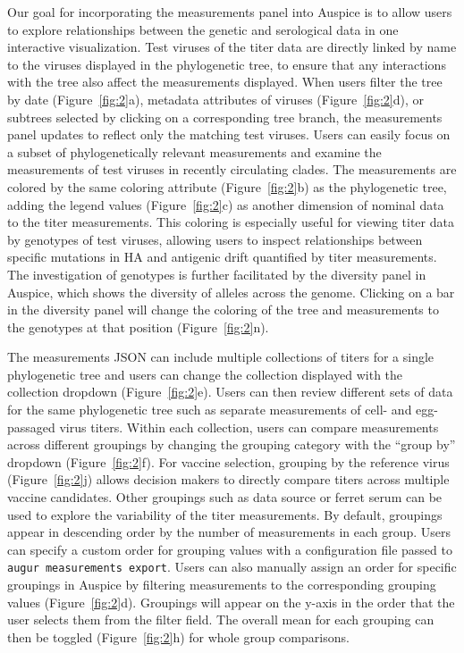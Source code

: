 \documentclass[utf8]{FrontiersinHarvard} %
\begin{document}
Our goal for incorporating the measurements panel into Auspice is to allow users to explore relationships between the genetic and serological data in one interactive visualization.
Test viruses of the titer data are directly linked by name to the viruses displayed in the phylogenetic tree, to ensure that any interactions with the tree also affect the measurements displayed.
When users filter the tree by date (Figure~\ref{fig:2}a), metadata attributes of viruses (Figure~\ref{fig:2}d), or subtrees selected by clicking on a corresponding tree branch, the measurements panel updates to reflect only the matching test viruses.
Users can easily focus on a subset of phylogenetically relevant measurements and examine the measurements of test viruses in recently circulating clades.
The measurements are colored by the same coloring attribute (Figure~\ref{fig:2}b) as the phylogenetic tree, adding the legend values (Figure~\ref{fig:2}c) as another dimension of nominal data to the titer measurements.
This coloring is especially useful for viewing titer data by genotypes of test viruses, allowing users to inspect relationships between specific mutations in HA and antigenic drift quantified by titer measurements.
The investigation of genotypes is further facilitated by the diversity panel in Auspice, which shows the diversity of alleles across the genome.
Clicking on a bar in the diversity panel will change the coloring of the tree and measurements to the genotypes at that position (Figure~\ref{fig:2}n).

The measurements JSON can include multiple collections of titers for a single phylogenetic tree and users can change the collection displayed with the collection dropdown (Figure~\ref{fig:2}e).
Users can then review different sets of data for the same phylogenetic tree such as separate measurements of cell- and egg-passaged virus titers.
Within each collection, users can compare measurements across different groupings by changing the grouping category with the ``group by'' dropdown (Figure~\ref{fig:2}f).
For vaccine selection, grouping by the reference virus (Figure~\ref{fig:2}j) allows decision makers to directly compare titers across multiple vaccine candidates.
Other groupings such as data source or ferret serum can be used to explore the variability of the titer measurements.
By default, groupings appear in descending order by the number of measurements in each group.
Users can specify a custom order for grouping values with a configuration file passed to \texttt{augur measurements export}.
Users can also manually assign an order for specific groupings in Auspice by filtering measurements to the corresponding grouping values (Figure~\ref{fig:2}d).
Groupings will appear on the y-axis in the order that the user selects them from the filter field.
The overall mean for each grouping can then be toggled (Figure~\ref{fig:2}h) for whole group comparisons.
\end{document}
